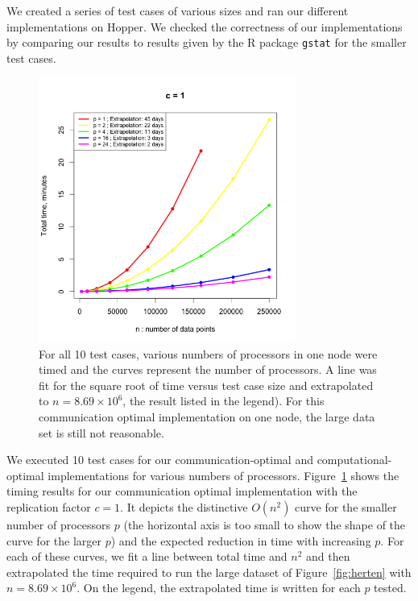 
We created a series of test cases of various sizes and ran our different implementations on Hopper. We checked the correctness of our implementations by comparing our results to results given by the R package \texttt{gstat} \cite{Pebesma} for the smaller test cases.

\begin{figure}[!h]
   \centering
   \includegraphics[width=0.75\textwidth]{./fig/comm_c1_timings.png} %
   \caption{For all 10 test cases, various numbers of processors in one node were timed and the curves represent the number of processors. A line was fit for the square root of time versus test case size and extrapolated to $n=8.69\times10^6$, the result listed in the legend). For this communication optimal implementation on one node, the large data set is still not reasonable.}
   \label{fig:comm_c1_timings}
\end{figure}

We executed 10 test cases for our communication-optimal and computational-optimal implementations for various numbers of processors. Figure~\ref{fig:comm_c1_timings} shows the timing results for our communication optimal implementation with the replication factor $c=1$. It depicts the distinctive $O(n^2)$ curve for the smaller number of processors $p$ (the horizontal axis is too small to show the shape of the curve for the larger $p$) and the expected reduction in time with increasing $p$. For each of these curves, we fit a line between total time and $n^2$ and then extrapolated the time required to run the large dataset of Figure~\ref{fig:herten} with $n=8.69\times10^6$. On the legend, the extrapolated time is written for each $p$ tested.  

